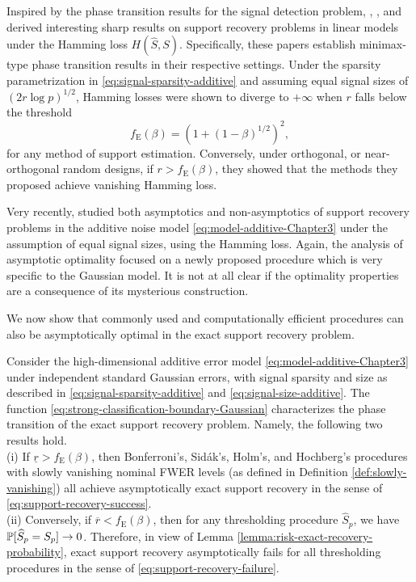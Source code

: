 Inspired by the phase transition results for the signal detection problem, \cite{ji2012ups}, \citet{genovese2012comparison}, and \cite{jin2014optimality} derived interesting sharp results on support recovery problems in linear models under the Hamming loss $H(\widehat S, S)$.
Specifically, these papers establish minimax-type phase transition results in their respective settings. 
Under the sparsity parametrization in \eqref{eq:signal-sparsity-additive} and assuming equal signal sizes of ${(2r\log{p})^{1/2}}$, Hamming losses were shown to diverge to $+\infty$ when $r$ falls below the threshold
\begin{equation} \label{eq:strong-classification-boundary-Gaussian}
    f_{\mathrm{E}}(\beta) = (1 + (1 - \beta)^{1/2})^2,
\end{equation}
for any method of support estimation.
Conversely, under orthogonal, or near-orthogonal random designs, if $r>f_{\mathrm{E}}(\beta)$, they showed that the methods they proposed achieve vanishing Hamming loss.

Very recently, \citet{butucea2018variable}\; studied both asymptotics and non-asymptotics of support recovery problems in the additive noise model \eqref{eq:model-additive-Chapter3} under the assumption of equal signal sizes, using the Hamming loss.
Again, the analysis of asymptotic optimality focused on a newly proposed procedure which is very specific to the Gaussian model.
It is not at all clear if the optimality properties are a consequence of its mysterious construction.

We now show that commonly used and computationally efficient procedures can also be asymptotically optimal in the exact support recovery problem.

\begin{theorem} \label{thm:Gaussian-error-exact-boundary}
Consider the high-dimensional additive error model \eqref{eq:model-additive-Chapter3} under independent standard Gaussian errors, with signal sparsity and size as described in \eqref{eq:signal-sparsity-additive} and \eqref{eq:signal-size-additive}.
The function \eqref{eq:strong-classification-boundary-Gaussian} characterizes the phase transition of the exact support recovery problem.
Namely, the following two results hold.\\

{\rm (i)} If $\underline{r} > f_{\mathrm{E}}(\beta)$, then Bonferroni's, Sid\'ak's, Holm's, and Hochberg's procedures with slowly vanishing  nominal FWER levels 
(as defined in Definition \ref{def:slowly-vanishing}) all achieve asymptotically exact support recovery in the sense of \eqref{eq:support-recovery-success}. \\

{\rm (ii)} Conversely, if $\overline{r} < f_{\mathrm{E}}(\beta)$, then for any thresholding procedure $\widehat{S}_p$, we have $\P[\widehat{S}_p=S_p]\to0$.
Therefore, in view of Lemma \ref{lemma:risk-exact-recovery-probability}, exact support recovery asymptotically fails for all thresholding procedures in the sense of \eqref{eq:support-recovery-failure}.
\end{theorem}

